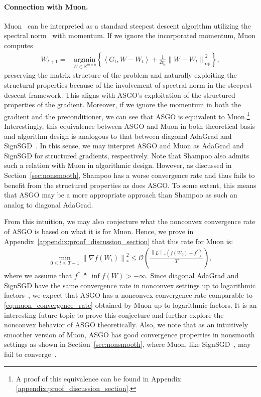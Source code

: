 \documentclass{article}
\theoremstyle{remark}
\newcommand{\Norm}[1]{\left\|#1\right\|}
\newcommand{\dotprod}[2]{\left\langle#1,#2\right\rangle}
\newcommand{\cO}{\mathcal{O}}
\newcommand{\RR}{\mathbb{R}}
\begin{document}
\paragraph{Connection with Muon.}
Muon~\citep{jordan2024muon} can be interpreted as a standard steepest descent algorithm utilizing the spectral norm~\citep{bernstein2024old} with momentum. If we ignore the incorporated momentum, Muon computes
\begin{align}\label{eq:muon_steepest_descent}
    W_{t+1} =& \underset{W \in \RR^{m\times n}}{\text{argmin}} \left\{ \dotprod{G_t}{W - W_t} + \frac{1}{2\eta_t} \Norm{W - W_t}_{\mathrm{op}}^2 \right\} ,
\end{align}
preserving the matrix structure of the problem and naturally exploiting the 
structural
properties because of the involvement of spectral norm in the steepest descent framework. This aligns with ASGO's exploitation of 
the structured properties
of the gradient. 
Moreover, if we ignore the momentum in both the gradient and the preconditioner, we can see that ASGO is equivalent to Muon.\footnote{A proof of this equivalence can be found in Appendix \ref{appendix:proof_discussion_section}.} Interestingly, this equivalence between ASGO and Muon in both theoretical basis and algorithm design is analogous to that between diagonal AdaGrad and SignSGD~\citep{bernstein2018signsgd,kunstner2023noise}. In this sense, we may interpret ASGO and Muon as AdaGrad and SignSGD for structured gradients, respectively. Note that Shampoo also admits such a relation with Muon in algorithmic design. However, as discussed in Section~\ref{sec:nonsmooth}, Shampoo has a worse convergence rate and thus fails to benefit from the structured properties as does ASGO. To some extent, this means that ASGO may be a more appropriate approach than Shampoo as such an analog to diagonal AdaGrad.

From this intuition, we may also conjecture what the nonconvex convergence rate of ASGO is based on what it is for Muon. Hence, we prove in Appendix~\ref{appendix:proof_discussion_section} that this rate for Muon is:
\begin{align}\label{eq:muon_convergence_rate}
    \min_{0\le t\le T-1} \Norm{\nabla f(W_t)}_*^2 \le \cO\left( \frac{\Norm{L}_* (f(W_0) - f^*) }{T} \right),
\end{align}
where we assume that $f^* \triangleq \inf f(W) > -\infty$. Since diagonal AdaGrad and SignSGD have the same convergence rate in nonconvex settings up to logarithmic factors~\citep{bernstein2018signsgd,sun2023momentum,liu2024adagrad}, we expect that ASGO has a nonconvex convergence rate comparable to \eqref{eq:muon_convergence_rate} obtained by Muon up to logarithmic factors. It is an interesting future topic to prove this conjecture and further explore the nonconvex behavior of ASGO theoretically. Also, we note that as an intuitively smoother version of Muon, ASGO has good convergence properties in nonsmooth settings as shown in Section~\ref{sec:nonsmooth}, where Muon, like SignSGD~\citep{bernstein2018signsgd}, may fail to converge~\citep{karimireddy2019error}.
\end{document}
